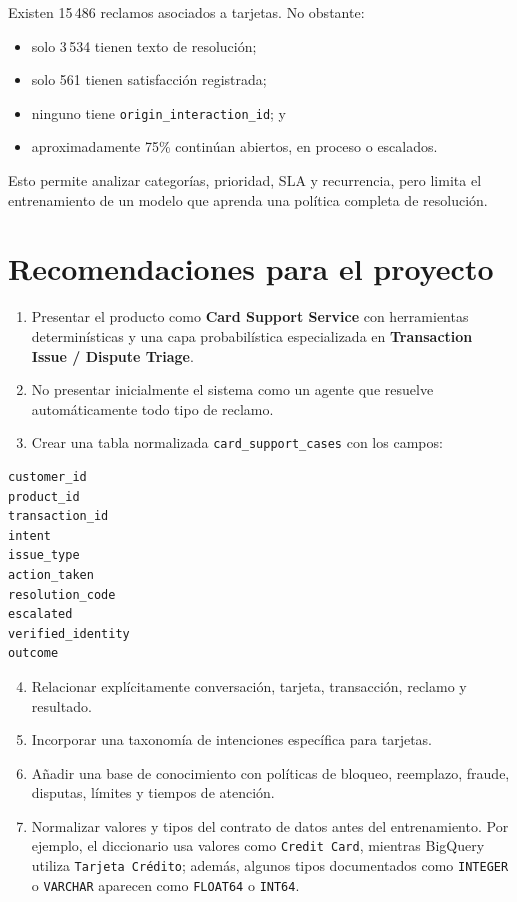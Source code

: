 \documentclass[11pt,a4paper]{article}
\begin{document}
Existen 15\,486 reclamos asociados a tarjetas. No obstante:

\begin{itemize}
  \item solo 3\,534 tienen texto de resolución;
  \item solo 561 tienen satisfacción registrada;
  \item ninguno tiene \texttt{origin\_interaction\_id}; y
  \item aproximadamente 75\% continúan abiertos, en proceso o escalados.
\end{itemize}

Esto permite analizar categorías, prioridad, SLA y recurrencia, pero limita el entrenamiento de un modelo que aprenda una política completa de resolución.

\section{Recomendaciones para el proyecto}

\begin{enumerate}
  \item Presentar el producto como \textbf{Card Support Service} con herramientas determinísticas y una capa probabilística especializada en \textbf{Transaction Issue / Dispute Triage}.
  \item No presentar inicialmente el sistema como un agente que resuelve automáticamente todo tipo de reclamo.
  \item Crear una tabla normalizada \texttt{card\_support\_cases} con los campos:
\end{enumerate}

\begin{lstlisting}
customer_id
product_id
transaction_id
intent
issue_type
action_taken
resolution_code
escalated
verified_identity
outcome
\end{lstlisting}

\begin{enumerate}
  \setcounter{enumi}{3}
  \item Relacionar explícitamente conversación, tarjeta, transacción, reclamo y resultado.
  \item Incorporar una taxonomía de intenciones específica para tarjetas.
  \item Añadir una base de conocimiento con políticas de bloqueo, reemplazo, fraude, disputas, límites y tiempos de atención.
  \item Normalizar valores y tipos del contrato de datos antes del entrenamiento. Por ejemplo, el diccionario usa valores como \texttt{Credit Card}, mientras BigQuery utiliza \texttt{Tarjeta Crédito}; además, algunos tipos documentados como \texttt{INTEGER} o \texttt{VARCHAR} aparecen como \texttt{FLOAT64} o \texttt{INT64}.
\end{enumerate}
\end{document}
